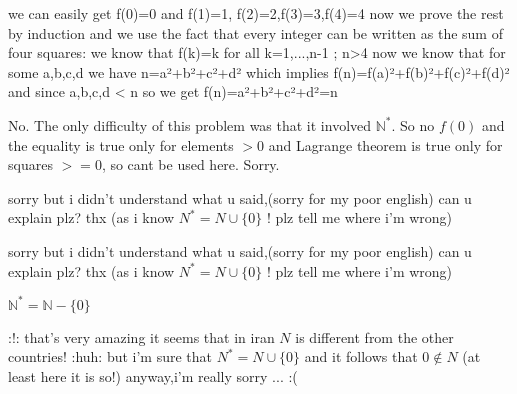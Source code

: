 \begin{solution}
	\begin{tcolorbox}we can easily get f(0)=0 and f(1)=1, f(2)=2,f(3)=3,f(4)=4
now we prove the rest by induction and we use the fact that every integer can be written as the sum of four squares:
we know that f(k)=k for all k=1,...,n-1 ; n>4
now we know that for some a,b,c,d we have n=a²+b²+c²+d² which implies f(n)=f(a)²+f(b)²+f(c)²+f(d)²
and since a,b,c,d < n so we get f(n)=a²+b²+c²+d²=n\end{tcolorbox}

No. The only difficulty of this problem was that it involved $ \mathbb N^*$. So no $ f(0)$ and the equality is true only for elements $ >0$ and Lagrange theorem is true only for squares $ >=0$, so cant be used here. 
Sorry.
\end{solution}



\begin{solution}
	sorry but i didn't understand what u said,(sorry for my poor english)
can u explain plz?
thx
(as i know $ N^*=N \cup \{0 \}$ ! plz tell me where i'm wrong)
\end{solution}



\begin{solution}
	\begin{tcolorbox}sorry but i didn't understand what u said,(sorry for my poor english)
can u explain plz?
thx
(as i know $ N^* = N \cup \{0 \}$ ! plz tell me where i'm wrong)\end{tcolorbox}

$ \mathbb{N^*}=\mathbb{N}-\{0\}$
\end{solution}



\begin{solution}
	:!:   that's very amazing it seems that in iran $ N$ is different from the other countries! :huh: 
but i'm sure that $ N^*=N \cup \{0 \}$ and it follows that $ 0\not \in N$ (at least here it is so!)
anyway,i'm really sorry ... :(
\end{solution}



